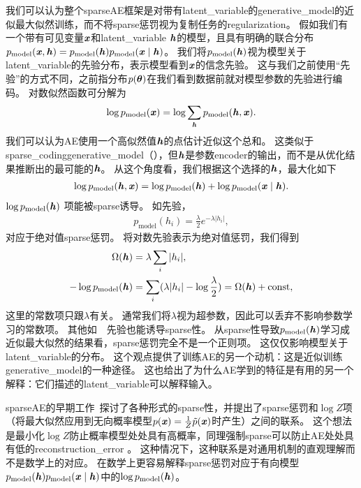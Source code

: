 
我们可以认为整个\gls{sparse}\gls{AE}框架是对带有\gls{latent_variable}的\gls{generative_model}的近似最大似然训练，而不将\gls{sparse}惩罚视为复制任务的\gls{regularization}。
假如我们有一个带有可见变量$\boldsymbol{\mathit{x}}$和\gls{latent_variable} $\boldsymbol{\mathit{h}}$的模型，且具有明确的联合分布$p_{\text{model}}(\boldsymbol{\mathit{x}},\boldsymbol{\mathit{h}})=p_{\text{model}}(\boldsymbol{\mathit{h}})p_{\text{model}} (\boldsymbol{\mathit{x}} \mid \boldsymbol{\mathit{h}})$。
我们将$p_{\text{model}}(\boldsymbol{\mathit{h}})$视为模型关于\gls{latent_variable}的先验分布，表示模型看到$\boldsymbol{\mathit{x}}$的信念先验。
这与我们之前使用``先验''的方式不同，之前指分布$p(\boldsymbol{\theta})$在我们看到数据前就对模型参数的先验进行编码。
对数似然函数可分解为
\begin{align}
\log p_{\text{model}}(\boldsymbol{\mathit{x}})=\log \sum_{\boldsymbol{\mathit{h}}} p_{\text{model}}(\boldsymbol{\mathit{h}}, \boldsymbol{\mathit{x}}) .
\end{align}
我们可以认为\gls{AE}使用一个高似然值$\boldsymbol{\mathit{h}}$的点估计近似这个总和。
这类似于\gls{sparse_coding}\gls{generative_model}（），但$\boldsymbol{\mathit{h}}$是参数\gls{encoder}的输出，而不是从优化结果推断出的最可能的$\boldsymbol{\mathit{h}}$。
从这个角度看，我们根据这个选择的$\boldsymbol{\mathit{h}}$，最大化如下
\begin{align}
\log p_{\text{model}}(\boldsymbol{\mathit{h}}, \boldsymbol{\mathit{x}})=\log p_{\text{model}}(\boldsymbol{\mathit{h}}) + \log p_{\text{model}}(\boldsymbol{\mathit{x}} \mid \boldsymbol{\mathit{h}}) .
\end{align}
$\log p_{\text{model}}(\boldsymbol{\mathit{h}}) $ 项能被\gls{sparse}诱导。
如先验，
\begin{align}
p_{\text{model}}(h_i) = \frac{\lambda}{2} e^{-\lambda | h_i |},
\end{align}
对应于绝对值\gls{sparse}惩罚。
将对数先验表示为绝对值惩罚，我们得到
\begin{align}
\Omega(\boldsymbol{\mathit{h}}) &= \lambda \sum_{i} | h_i  |,\\ 
-\log p_{\text{model}}(\boldsymbol{\mathit{h}}) &= 
\sum_i (\lambda | h_i | - \log \frac{\lambda}{2}) = \Omega(\boldsymbol{\mathit{h}}) + \text{const},
\end{align}
这里的常数项只跟$\lambda$有关。
通常我们将$\lambda$视为超参数，因此可以丢弃不影响参数学习的常数项。
其他如~~先验也能诱导\gls{sparse}性。
从\gls{sparse}性导致$p_{\text{model}}(\boldsymbol{\mathit{h}})$学习成近似最大似然的结果看，\gls{sparse}惩罚完全不是一个正则项。
这仅仅影响模型关于\gls{latent_variable}的分布。
这个观点提供了训练\gls{AE}的另一个动机：这是近似训练\gls{generative_model}的一种途径。
这也给出了为什么\gls{AE}学到的特征是有用的另一个解释：它们描述的\gls{latent_variable}可以解释输入。


\gls{sparse}\gls{AE}的早期工作~\citep{ranzato-07-small,ranzato-08-small}探讨了各种形式的\gls{sparse}性，并提出了\gls{sparse}惩罚和$\log  Z$项（将最大似然应用到无向概率模型$p(\boldsymbol{\mathit{x}})=\frac{1}{Z}\tilde{p}(\boldsymbol{\mathit{x}})$时产生）之间的联系。
这个想法是最小化$\log Z$防止概率模型处处具有高概率，同理强制\gls{sparse}可以防止\gls{AE}处处具有低的\gls{reconstruction_error} 。
这种情况下，这种联系是对通用机制的直观理解而不是数学上的对应。
在数学上更容易解释\gls{sparse}惩罚对应于有向模型$p_{\text{model}}(\boldsymbol{\mathit{h}})p_{\text{model}}(\boldsymbol{\mathit{x}} \mid \boldsymbol{\mathit{h}}) $中的$\log p_{\text{model}}(\boldsymbol{\mathit{h}})$。



